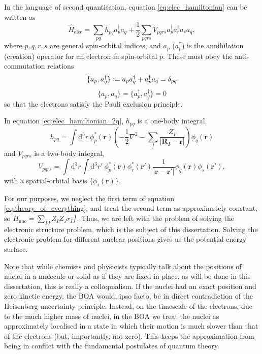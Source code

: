 In the language of second quantisation, equation \eqref{eq:elec_hamiltonian} can be written as
\begin{equation}
\label{eq:elec_hamiltonian_2q}
\hat H_\mathrm{elec} = \sum_{pq} h_{pq}a_{p}^\dag a_{q}+\frac 12 \sum_{pqrs} V_{pqrs}a_{p}^\dag a_{r}^\dag a_{s}a_{q},
\end{equation}
where $p,q,r,s$ are general spin-orbital indices, and $a_{p}$ ($a_{p}^\dag$) is the annihilation (creation) operator for an electron in spin-orbital $p$. These must obey the anti-commutation relations
\begin{equation}
    \{a_{p},a_{q}^\dag\}
    \mathrel{\mathop:}=
    a_{p}a_{q}^\dag + a_{p}^\dag a_{q}
    =\delta_{pq}
\end{equation}
\begin{equation}
    \{a_{p},a_{q}\} = \{a_{p}^\dag,a_{q}^\dag\} = 0
\end{equation}
so that the electrons satisfy the Pauli exclusion principle.

In equation \ref{eq:elec_hamiltonian_2q}, $h_{pq}$ is a one-body integral,
\begin{equation}
\label{eq:hij}
h_{pq} = \int \mathrm{d}^3r\ \phi_p^*(\mathbf{r})\left(-\frac 12 \nabla^2 - \sum_I \frac{Z_I}{|\mathbf{R}_I-\mathbf r|}\right)\phi_q(\mathbf{r})
\end{equation}
and $V_{pqrs}$ is a two-body integral,
\begin{equation}
V_{pqrs} = \int \mathrm{d}^3r\int\mathrm{d}^3r'\ \phi_p^*(\mathbf{r})\phi_r^*(\mathbf{r}')\frac{1}{|\mathbf{r}-\mathbf{r}'|}\phi_q(\mathbf{r})\phi_s(\mathbf{r}'),
\end{equation}
with a spatial-orbital basis $\{\phi_i(\mathbf{r})\}$.

For our purposes, we neglect the first term of equation \eqref{eq:theory_of_everything}, and treat the second term as approximately constant, so $\hat H_\mathrm{nuc} = \sum_{IJ} Z_IZ_Jr_{IJ}^{-1}$. Thus, we are left with the problem of solving the electronic structure problem, which is the subject of this dissertation. Solving the electronic problem for different nuclear positions gives us the potential energy surface.

Note that while chemists and physicists typically talk about the positions of nuclei in a molecule or solid as if they are fixed in place, as will be done in this dissertation, this is really a colloquialism. If the nuclei had an exact position and zero kinetic energy, the \gls{BOA} would, ipso facto, be in direct contradiction of the Heisenberg uncertainty principle. Instead, on the timescale of the electrons, due to the much higher mass of nuclei, in the \gls{BOA} we treat the nuclei as approximately localised in a state in which their motion is much slower than that of the electrons (but, importantly, not zero). This keeps the approximation from being in conflict with the fundamental postulates of quantum theory.

